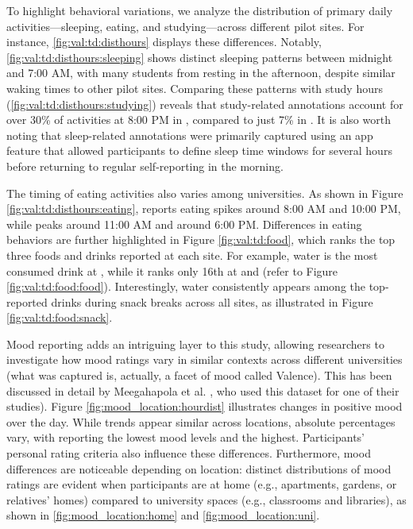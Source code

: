 
To highlight behavioral variations, we analyze the distribution of primary daily activities—sleeping, eating, and studying—across different pilot sites. For instance, \cref{fig:val:td:disthours} displays these differences. Notably, \cref{fig:val:td:disthours:sleeping} shows distinct sleeping patterns between midnight and 7:00 AM, with many students from \JLU resting in the afternoon, despite similar waking times to other pilot sites. Comparing these patterns with study hours (\cref{fig:val:td:disthours:studying}) reveals that study-related annotations account for over 30\% of activities at 8:00 PM in \JLU, compared to just 7\% in \IPICYT. It is also worth noting that sleep-related annotations were primarily captured using an app feature that allowed participants to define sleep time windows for several hours before returning to regular self-reporting in the morning.

The timing of eating activities also varies among universities. As shown in Figure \ref{fig:val:td:disthours:eating}, \AMRITA reports eating spikes around 8:00 AM and 10:00 PM, while \NUM peaks around 11:00 AM and \UC around 6:00 PM. Differences in eating behaviors are further highlighted in Figure \ref{fig:val:td:food}, which ranks the top three foods and drinks reported at each site. For example, water is the most consumed drink at \UNITN, while it ranks only 16th at \NUM and \JLU (refer to Figure \ref{fig:val:td:food:food}). Interestingly, water consistently appears among the top-reported drinks during snack breaks across all sites, as illustrated in Figure \ref{fig:val:td:food:snack}.

Mood reporting adds an intriguing layer to this study, allowing researchers to investigate how mood ratings vary in similar contexts across different universities (what was captured is, actually, a facet of mood called Valence). This has been discussed in detail by Meegahapola et al. \cite{meegahapola2023generalization}, who used this dataset for one of their studies). Figure \ref{fig:mood_location:hourdist} illustrates changes in positive mood over the day. While trends appear similar across locations, absolute percentages vary, with \UC reporting the lowest mood levels and \AMRITA the highest. Participants’ personal rating criteria also influence these differences. Furthermore, mood differences are noticeable depending on location: distinct distributions of mood ratings are evident when participants are at home (e.g., apartments, gardens, or relatives' homes) compared to university spaces (e.g., classrooms and libraries), as shown in \cref{fig:mood_location:home} and \cref{fig:mood_location:uni}.

